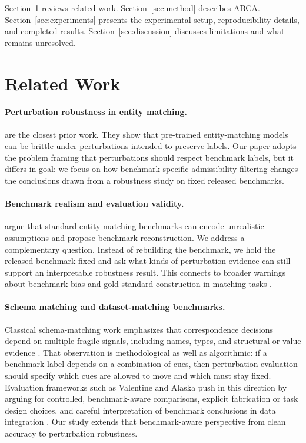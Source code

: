 \documentclass{article}
\newcommand{\abca}{\textsc{ABCA}}
\begin{document}
Section~\ref{sec:related} reviews related work. Section~\ref{sec:method} describes \abca{}. Section~\ref{sec:experiments} presents the experimental setup, reproducibility details, and completed results. Section~\ref{sec:discussion} discusses limitations and what remains unresolved.

\section{Related Work}
\label{sec:related}
\paragraph{Perturbation robustness in entity matching.}
\citet{rastaghi2022probing} are the closest prior work. They show that pre-trained entity-matching models can be brittle under perturbations intended to preserve labels. Our paper adopts the problem framing that perturbations should respect benchmark labels, but it differs in goal: we focus on how benchmark-specific admissibility filtering changes the conclusions drawn from a robustness study on fixed released benchmarks.

\paragraph{Benchmark realism and evaluation validity.}
\citet{wang2022bridging} argue that standard entity-matching benchmarks can encode unrealistic assumptions and propose benchmark reconstruction. We address a complementary question. Instead of rebuilding the benchmark, we hold the released benchmark fixed and ask what kinds of perturbation evidence can still support an interpretable robustness result. This connects to broader warnings about benchmark bias and gold-standard construction in matching tasks \citep{hertling2020oaei}.

\paragraph{Schema matching and dataset-matching benchmarks.}
Classical schema-matching work emphasizes that correspondence decisions depend on multiple fragile signals, including names, types, and structural or value evidence \citep{rahm2001survey,madhavan2001cupid}. That observation is methodological as well as algorithmic: if a benchmark label depends on a combination of cues, then perturbation evaluation should specify which cues are allowed to move and which must stay fixed. Evaluation frameworks such as Valentine and Alaska push in this direction by arguing for controlled, benchmark-aware comparisons, explicit fabrication or task design choices, and careful interpretation of benchmark conclusions in data integration \citep{koutras2021valentine,crescenzi2021alaska}. Our study extends that benchmark-aware perspective from clean accuracy to perturbation robustness.
\end{document}
